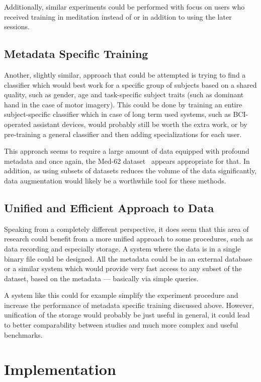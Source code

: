 \documentclass[english, he, bc, kiv, iso690alph, viewonly]{fasthesis}
\begin{document}
Additionally, similar experiments could be performed with focus on users who received training in meditation instead of or in addition to using the later sessions.

\section{Metadata Specific Training}
\label{sec:metadata:specific}

Another, slightly similar, approach that could be attempted is trying to find a classifier which would best work for a specific group of subjects based on a shared quality, such as gender, age and task-specific subject traits (such as dominant hand in the case of motor imagery). This could be done by training an entire subject-specific classifier which in case of long term used systems, such as BCI-operated assistant devices, would probably still be worth the extra work, or by pre-training a general classifier and then adding specializations for each user.

This approach seems to require a large amount of data equipped with profound metadata and once again, the Med-62 dataset~\cite{data:stieger:21} appears appropriate for that. In addition, as using subsets of datasets reduces the volume of the data significantly, data augmentation would likely be a worthwhile tool for these methods.

\section{Unified and Efficient Approach to Data}

Speaking from a completely different perspective, it does seem that this area of research could benefit from a more unified approach to some procedures, such as data recording and especially storage. A system where the data is in a single binary file could be designed. All the metadata could be in an external database or a similar system which would provide very fast access to any subset of the dataset, based on the metadata --- basically via simple queries.

A system like this could for example simplify the experiment procedure and increase the performance of metadata specific training discussed above. However, unification of the storage would probably be just useful in general, it could lead to better comparability between studies and much more complex and useful benchmarks.

\chapter{Implementation}
\end{document}
